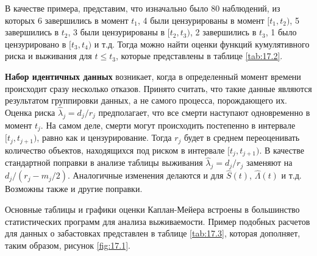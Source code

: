 В качестве примера, представим, что изначально было 80 наблюдений, из которых 6 завершились в момент $t_1$,  4 были цензурированы в момент $[t_1,t_2)$, 5 завершились в $t_2$, 3 были цензурированы в $[t_2,t_3)$, 2 завершились в $t_3$, 1 было цензурировано в $[t_3,t_4)$ и т.д. Тогда можно найти оценки функций кумулятивного риска и выживания для $t\le t_3$, которые представлены в таблице \ref{tab:17.2}.

\textbf{Набор идентичных данных}
возникает, когда в определенный момент времени происходит сразу несколько отказов. Принято считать, что такие данные являются результатом группировки данных, а не самого процесса, порождающего их. Оценка риска $\hat{\lambda}_j=d_j/r_j$ предполагает, что все смерти наступают одновременно в момент $t_j$. На самом деле, смерти могут происходить постепенно в интервале $[t_j,t_{j+1})$, равно как и цензурирование. Тогда $r_j$ будет в среднем переоценивать количество объектов, находящихся под риском в интервале $[t_j,t_{j+1})$. В качестве стандартной поправки в анализе таблицы выживания $\hat{\lambda}_j=d_j/r_j$ заменяют на $d_j/(r_j-m_j/2)$. Аналогичные изменения делаются и для $\hat{S}(t)$, $\hat{\Lambda}(t)$ и т.д. Возможны также и другие поправки.

Основные таблицы и графики оценки Каплан-Мейера встроены в большинство статистических программ для анализа выживаемости. Пример подобных расчетов для данных о забастовках представлен в таблице \ref{tab:17.3}, которая дополняет, таким образом, рисунок \ref{fig:17.1}.

